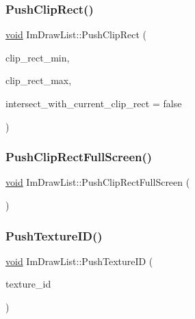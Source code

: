 \mbox{\label{structImDrawList_a608a9d9a83715ba87dced8321ed64329}} 
\subsubsection{\texorpdfstring{Push\+Clip\+Rect()}{PushClipRect()}}
{\footnotesize\ttfamily \hyperlink{imgui__impl__opengl3__loader_8h_ac668e7cffd9e2e9cfee428b9b2f34fa7}{void} Im\+Draw\+List\+::\+Push\+Clip\+Rect (\begin{DoxyParamCaption}\item[{const \hyperlink{structImVec2}{Im\+Vec2} \&}]{clip\+\_\+rect\+\_\+min,  }\item[{const \hyperlink{structImVec2}{Im\+Vec2} \&}]{clip\+\_\+rect\+\_\+max,  }\item[{bool}]{intersect\+\_\+with\+\_\+current\+\_\+clip\+\_\+rect = {\ttfamily false} }\end{DoxyParamCaption})}

\mbox{\label{structImDrawList_a0ab1ab409f0e269755e50a77901bae39}} 
\subsubsection{\texorpdfstring{Push\+Clip\+Rect\+Full\+Screen()}{PushClipRectFullScreen()}}
{\footnotesize\ttfamily \hyperlink{imgui__impl__opengl3__loader_8h_ac668e7cffd9e2e9cfee428b9b2f34fa7}{void} Im\+Draw\+List\+::\+Push\+Clip\+Rect\+Full\+Screen (\begin{DoxyParamCaption}{ }\end{DoxyParamCaption})}

\mbox{\label{structImDrawList_a7ac41e329a9df911b4823ef0150cee16}} 
\subsubsection{\texorpdfstring{Push\+Texture\+I\+D()}{PushTextureID()}}
{\footnotesize\ttfamily \hyperlink{imgui__impl__opengl3__loader_8h_ac668e7cffd9e2e9cfee428b9b2f34fa7}{void} Im\+Draw\+List\+::\+Push\+Texture\+ID (\begin{DoxyParamCaption}\item[{Im\+Texture\+ID}]{texture\+\_\+id }\end{DoxyParamCaption})}



